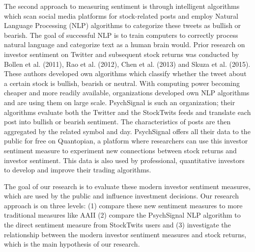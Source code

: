 \par
The second approach to measuring sentiment is through intelligent algorithms which scan social media platforms for stock-related posts and employ Natural Language Processing (NLP) algorithms to categorize these tweets as bullish or bearish. The goal of successful NLP is to train computers to correctly process natural language and categorize text as a human brain would. Prior research on investor sentiment on Twitter and subsequent stock returns was conducted by Bollen et al. (2011), Rao et al. (2012), Chen et al. (2013) and Skuza et al. (2015). These authors developed own algorithms which classify whether the tweet about a certain stock is bullish, bearish or neutral. With computing power becoming cheaper and more readily available, organizations developed own NLP algorithms and are using them on large scale. PsychSignal is such an organization; their algorithms evaluate both the Twitter and the StockTwits feeds and translate each post into bullish or bearish sentiment. The characteristics of posts are then aggregated by the related symbol and day. PsychSignal offers all their data to the public for free on Quantopian, a platform where researchers can use this investor sentiment measure to experiment new connections between stock returns and investor sentiment. This data is also used by professional, quantitative investors to develop and improve their trading algorithms.
\par
The goal of our research is to evaluate these modern investor sentiment measures, which are used by the public and influence investment decisions. Our research approach is on three levels: (1) compare these new sentiment measures to more traditional measures like AAII (2) compare the PsychSignal NLP algorithm to the direct sentiment measure from StockTwits users and (3) investigate the relationship between the modern investor sentiment measures and stock returns, which is the main hypothesis of our research. 

